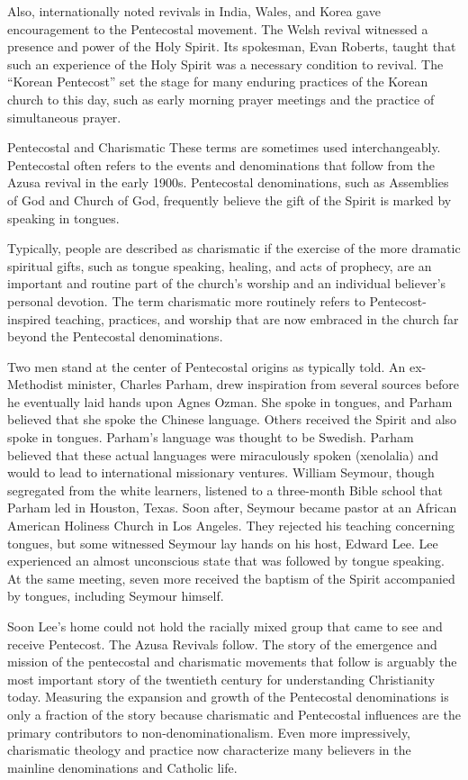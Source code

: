 Also, internationally noted revivals in India, Wales, and Korea gave encouragement to the
Pentecostal movement. The Welsh revival witnessed a presence and power of the Holy Spirit. Its
spokesman, Evan Roberts, taught that such an experience of the Holy Spirit was a necessary condition
to revival. The “Korean Pentecost” set the stage for many enduring practices of the Korean church to
this day, such as early morning prayer meetings and the practice of simultaneous prayer.

\begin{sidebar}{Pentecostal and Charismatic}
These terms are sometimes used interchangeably. Pentecostal often refers to the events and
denominations that follow from the Azusa revival in the early 1900s. Pentecostal denominations, such
as Assemblies of God and Church of God, frequently believe the gift of the Spirit is marked by
speaking in tongues.

Typically, people are described as charismatic if the exercise of the more dramatic spiritual gifts,
such as tongue speaking, healing, and acts of prophecy, are an important and routine part of the
church’s worship and an individual believer’s personal devotion. The term charismatic more routinely
refers to Pentecost-inspired teaching, practices, and worship that are now embraced in the church
far beyond the Pentecostal denominations.
\end{sidebar}

Two men stand at the center of Pentecostal origins as typically told. An ex-Methodist minister,
Charles Parham, drew inspiration from several sources before he eventually laid hands upon Agnes
Ozman. She spoke in tongues, and Parham believed that she spoke the Chinese language. Others
received the Spirit and also spoke in tongues. Parham’s language was thought to be Swedish. Parham
believed that these actual languages were miraculously spoken (xenolalia) and would to lead to
international missionary ventures. William Seymour, though segregated from the white learners,
listened to a three-month Bible school that Parham led in Houston, Texas. Soon after, Seymour became
pastor at an African American Holiness Church in Los Angeles. They rejected his teaching concerning
tongues, but some witnessed Seymour lay hands on his host, Edward Lee. Lee experienced an almost
unconscious state that was followed by tongue speaking. At the same meeting, seven more received the
baptism of the Spirit accompanied by tongues, including Seymour himself.

Soon Lee’s home could not hold the racially mixed group that came to see and receive Pentecost. The
Azusa Revivals follow. The story of the emergence and mission of the pentecostal and charismatic
movements that follow is arguably the most important story of the twentieth century for
understanding Christianity today. Measuring the expansion and growth of the Pentecostal
denominations is only a fraction of the story because charismatic and Pentecostal influences are the
primary contributors to non-denominationalism. Even more impressively, charismatic theology and
practice now characterize many believers in the mainline denominations and Catholic life.

